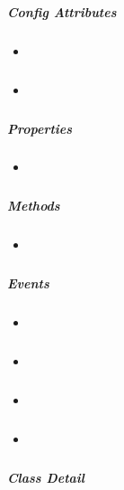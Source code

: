 \documentclass[letterpaper,10pt,english]{sphinxmanual}
\begin{document}
\subparagraph{Config Attributes}
\label{api/component/dd/droppable-delegate:config-attributes}\begin{itemize}
\item {}
{\hyperref[api/component/dd/droppable-delegate:DroppableDelegate.container]{}}

\item {}
{\hyperref[api/component/dd/droppable-delegate:DroppableDelegate.selector]{}}

\end{itemize}


\subparagraph{Properties}
\label{api/component/dd/droppable-delegate:properties}\begin{itemize}
\item {}
{\hyperref[api/component/dd/droppable-delegate:DroppableDelegate.node]{}}

\end{itemize}


\subparagraph{Methods}
\label{api/component/dd/droppable-delegate:methods}\begin{itemize}
\item {}
{\hyperref[api/component/dd/droppable-delegate:DroppableDelegate.destroy]{}}

\end{itemize}


\subparagraph{Events}
\label{api/component/dd/droppable-delegate:events}\begin{itemize}
\item {}
{\hyperref[api/component/dd/droppable-delegate:DroppableDelegate.dropenter]{}}

\item {}
{\hyperref[api/component/dd/droppable-delegate:DroppableDelegate.dropover]{}}

\item {}
{\hyperref[api/component/dd/droppable-delegate:DroppableDelegate.dropexit]{}}

\item {}
{\hyperref[api/component/dd/droppable-delegate:DroppableDelegate.drophit]{}}

\end{itemize}


\subparagraph{Class Detail}
\label{api/component/dd/droppable-delegate:class-detail}
\end{document}

